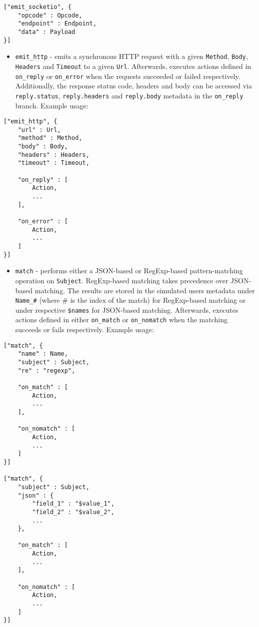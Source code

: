 \documentclass[a4paper]{article}
\begin{document}
\begin{verbatim}
["emit_socketio", {
    "opcode" : Opcode,
    "endpoint" : Endpoint,
    "data" : Payload
}]
\end{verbatim}





\begin{itemize}
\item \texttt{emit\_http} - emits a synchronous HTTP request with a given \texttt{Method}, \texttt{Body}, \texttt{Headers} and \texttt{Timeout} to a given \texttt{Url}. Afterwards, executes actions defined in \texttt{on\_reply} or \texttt{on\_error} when the requests succeeded or failed respectively. Additionally, the response status code, headers and body can be accessed via \texttt{reply.status}, \texttt{reply.headers} and \texttt{reply.body} metadata in the \texttt{on\_reply} branch. Example usage:
\end{itemize}

\begin{verbatim}
["emit_http", {
    "url" : Url,
    "method" : Method,
    "body" : Body,
    "headers" : Headers,
    "timeout" : Timeout,

    "on_reply" : [
        Action,
        ...
    ],

    "on_error" : [
        Action,
        ...
    ]
}]
\end{verbatim}





\begin{itemize}
\item \texttt{match} - performs either a JSON-based or RegExp-based pattern-matching operation on \texttt{Subject}. RegExp-based matching takes precedence over JSON-based matching. The results are stored in the simulated users metadata under \texttt{Name\_\#} (where \# is the index of the match) for RegExp-based matching or under respective \texttt{\$names} for JSON-based matching. Afterwards, executes actions defined in either \texttt{on\_match} or \texttt{on\_nomatch} when the matching succeeds or fails respectively. Example usage:
\end{itemize}

\begin{verbatim}
["match", {
    "name" : Name,
    "subject" : Subject,
    "re" : "regexp",

    "on_match" : [
        Action,
        ...
    ],

    "on_nomatch" : [
        Action,
        ...
    ]
}]

["match", {
    "subject" : Subject,
    "json" : {
        "field_1" : "$value_1",
        "field_2" : "$value_2",
        ...
    },

    "on_match" : [
        Action,
        ...
    ],

    "on_nomatch" : [
        Action,
        ...
    ]
}]
\end{verbatim}
\end{document}
